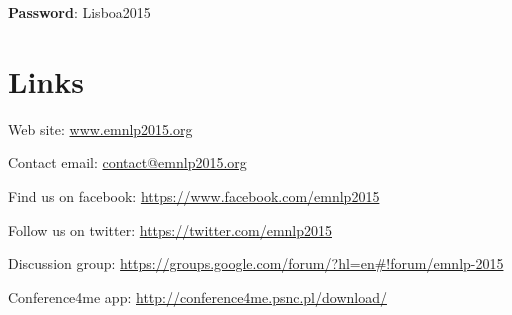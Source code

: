 \textbf{Password}: Lisboa2015


\section*{Links}

Web site: \url{www.emnlp2015.org}

Contact email: \url{contact@emnlp2015.org}

Find us on facebook: \url{https://www.facebook.com/emnlp2015}

Follow us on twitter: \url{https://twitter.com/emnlp2015}

Discussion group: \url{https://groups.google.com/forum/?hl=en#!forum/emnlp-2015}

Conference4me app: \url{http://conference4me.psnc.pl/download/}

\clearpage{}\thispagestyle{empty}
